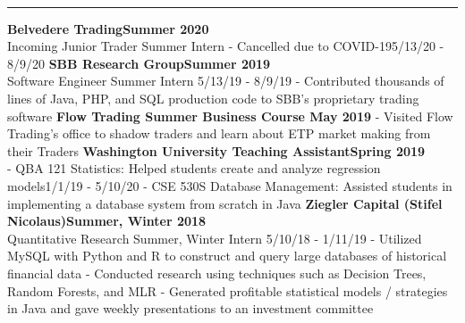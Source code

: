 \documentclass[11pt]{article}
\begin{document}
\begin{titlepage}
\begin{addmargin}[1em]{0em}
\begin{center}
\begin{minipage}[b]{0.3\textwidth}
				\end{minipage}
			\end{center}
		\end{addmargin}
		\vspace{-10pt}
		\noindent
		\\\rule{\textwidth}{0.4pt}
		\begin{addmargin}[1em]{0em}
		    \textbf{Belvedere Trading\hfill Summer 2020}\\
Incoming Junior Trader Summer Intern - Cancelled due to COVID-19\hfill {\small{5/13/20 - 8/9/20}}\newline
    		\textbf{SBB Research Group\hfill Summer 2019}\\
Software Engineer Summer Intern \hfill {\small{5/13/19 - 8/9/19}}\newline
- Contributed thousands of lines of Java, PHP, and SQL production code to SBB's proprietary trading software\newline
            \textbf{Flow Trading Summer Business Course \hfill May 2019}\newline
- Visited Flow Trading's office to shadow traders and learn about ETP market making from their Traders\newline
		    \textbf{Washington University Teaching Assistant\hfill Spring 2019}\\
- QBA 121 Statistics: Helped students create and analyze regression models\hfill {\small{1/1/19 - 5/10/20}}\newline
- CSE 530S Database Management: Assisted students in implementing a database system from scratch in Java\newline
			\textbf{Ziegler Capital (Stifel Nicolaus)\hfill Summer, Winter 2018}\\
Quantitative Research Summer, Winter Intern \hfill {\small{5/10/18 - 1/11/19}}\newline
- Utilized MySQL with Python and R to construct and query large databases of historical financial data \newline
- Conducted research using techniques such as Decision Trees, Random Forests, and MLR\newline
- Generated profitable statistical models / strategies in Java and gave weekly presentations to an investment committee\newline
		\end{addmargin}
		\vspace{-10pt}

\end{titlepage}
\end{document}
